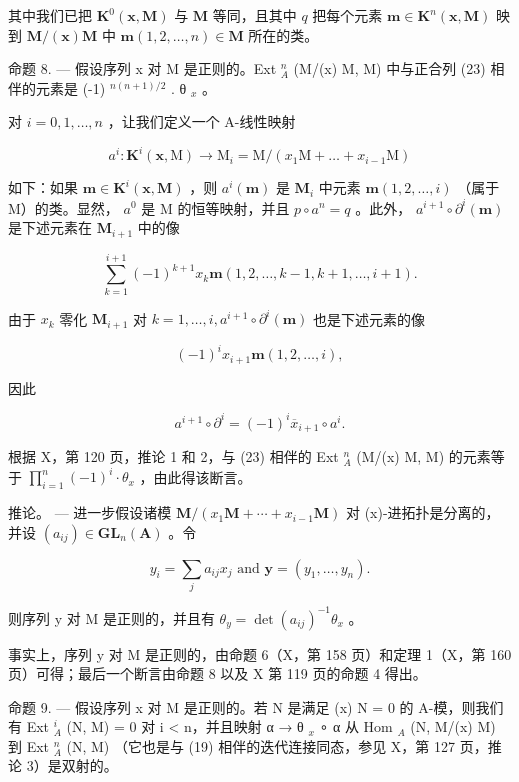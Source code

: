 其中我们已把 \(\mathbf{K}^{0}(\boldsymbol{x},\mathbf{M})\) 与 \(\mathbf{M}\) 等同，且其中 \(q\) 把每个元素 \(\boldsymbol{m}\in\mathbf{K}^{n}(\boldsymbol{x},\mathbf{M})\) 映到 \(\mathbf{M}/(\boldsymbol{x})\mathbf{M}\) 中 \(\boldsymbol{m}(1,2,\ldots,n)\in\mathbf{M}\) 所在的类。

命题 8. --- 假设序列 x 对 M 是正则的。Ext \(_{A}^{n}\) (M/(x) M, M) 中与正合列 (23) 相伴的元素是 (-1) \(^{n(n+1)/2}\) . θ \(_{x}\) 。

对 \(i = 0,1,\dots,n\) ，让我们定义一个 A-线性映射

\[
a ^ {i}: \mathbf {K} ^ {i} (\boldsymbol {x}, \mathrm{M}) \rightarrow \mathrm{M} _ {i} = \mathrm{M} / (x _ {1} \mathrm{M} + \dots + x _ {i - 1} \mathrm{M})
\]

如下：如果 \(\boldsymbol{m} \in \mathbf{K}^i(\boldsymbol{x}, \mathbf{M})\) ，则 \(a^i(\boldsymbol{m})\) 是 \(\mathbf{M}_i\) 中元素 \(\boldsymbol{m}(1, 2, \ldots, i)\) （属于 M）的类。显然， \(a^0\) 是 M 的恒等映射，并且 \(p \circ a^n = q\) 。此外， \(a^{i+1} \circ \partial^i(\boldsymbol{m})\) 是下述元素在 \(\mathbf{M}_{i+1}\) 中的像

\[
\sum_ {k = 1} ^ {i + 1} (- 1) ^ {k + 1} x _ {k} \boldsymbol {m} (1, 2, \dots , k - 1, k + 1, \dots , i + 1).
\]

由于 \(x_{k}\) 零化 \(\mathbf{M}_{i+1}\) 对 \(k=1,\ldots,i,a^{i+1}\circ\partial^{i}(\boldsymbol{m})\) 也是下述元素的像

\[
(- 1) ^ {i} x _ {i + 1} \boldsymbol {m} (1, 2, \dots , i),
\]

因此

\[
a ^ {i + 1} \circ \partial^ {i} = (- 1) ^ {i} \overline {{{x}}} _ {i + 1} \circ a ^ {i}.
\]

根据 X，第 120 页，推论 1 和 2，与 (23) 相伴的 Ext \(_{A}^{n}\) (M/(x) M, M) 的元素等于 \(\prod_{i=1}^{n} (-1)^{i} \cdot \theta_{x}\) ，由此得该断言。

推论。 — 进一步假设诸模 \(\mathbf{M}/(x_{1}\mathbf{M}+\cdots+x_{i-1}\mathbf{M})\) 对 (x)-进拓扑是分离的，并设 \((a_{ij})\in\mathbf{GL}_{n}(\mathbf{A})\) 。令

\[
y _ {i} = \sum_ {j} a _ {i j} x _ {j} \text { and } \mathbf {y} = (y _ {1}, \dots , y _ {n}).
\]

则序列 y 对 M 是正则的，并且有 \(\theta_{y} = \det (a_{ij})^{-1}\theta_{x}\) 。

事实上，序列 y 对 M 是正则的，由命题 6（X，第 158 页）和定理 1（X，第 160 页）可得；最后一个断言由命题 8 以及 X 第 119 页的命题 4 得出。

命题 9. --- 假设序列 x 对 M 是正则的。若 N 是满足 (x) N = 0 的 A-模，则我们有 Ext \(_{A}^{i}\) (N, M) = 0 对 i \textless{} n，并且映射 α → θ \(_{x}\) ∘ α 从 Hom \(_{A}\) (N, M/(x) M) 到 Ext \(_{A}^{n}\) (N, M) （它也是与 (19) 相伴的迭代连接同态，参见 X，第 127 页，推论 3）是双射的。

